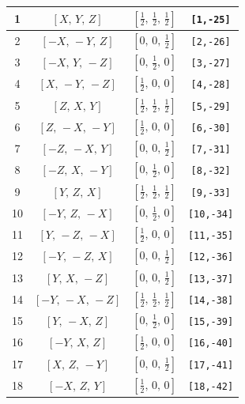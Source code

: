 \documentclass[fleqn,8pt]{jsarticle}
\begin{document}
\begin{longtable}{cccc}
1 & $\left[ X,\, Y,\, Z \right]$ & $\left[ \frac{1}{2},\, \frac{1}{2},\, \frac{1}{2} \right]$ & {\tt [1,-25]} \\ \hline
2 & $\left[ - X,\, - Y,\, Z \right]$ & $\left[ 0,\, 0,\, \frac{1}{2} \right]$ & {\tt [2,-26]} \\ \hline
3 & $\left[ - X,\, Y,\, - Z \right]$ & $\left[ 0,\, \frac{1}{2},\, 0 \right]$ & {\tt [3,-27]} \\ \hline
4 & $\left[ X,\, - Y,\, - Z \right]$ & $\left[ \frac{1}{2},\, 0,\, 0 \right]$ & {\tt [4,-28]} \\ \hline
5 & $\left[ Z,\, X,\, Y \right]$ & $\left[ \frac{1}{2},\, \frac{1}{2},\, \frac{1}{2} \right]$ & {\tt [5,-29]} \\ \hline
6 & $\left[ Z,\, - X,\, - Y \right]$ & $\left[ \frac{1}{2},\, 0,\, 0 \right]$ & {\tt [6,-30]} \\ \hline
7 & $\left[ - Z,\, - X,\, Y \right]$ & $\left[ 0,\, 0,\, \frac{1}{2} \right]$ & {\tt [7,-31]} \\ \hline
8 & $\left[ - Z,\, X,\, - Y \right]$ & $\left[ 0,\, \frac{1}{2},\, 0 \right]$ & {\tt [8,-32]} \\ \hline
9 & $\left[ Y,\, Z,\, X \right]$ & $\left[ \frac{1}{2},\, \frac{1}{2},\, \frac{1}{2} \right]$ & {\tt [9,-33]} \\ \hline
10 & $\left[ - Y,\, Z,\, - X \right]$ & $\left[ 0,\, \frac{1}{2},\, 0 \right]$ & {\tt [10,-34]} \\ \hline
11 & $\left[ Y,\, - Z,\, - X \right]$ & $\left[ \frac{1}{2},\, 0,\, 0 \right]$ & {\tt [11,-35]} \\ \hline
12 & $\left[ - Y,\, - Z,\, X \right]$ & $\left[ 0,\, 0,\, \frac{1}{2} \right]$ & {\tt [12,-36]} \\ \hline
13 & $\left[ Y,\, X,\, - Z \right]$ & $\left[ 0,\, 0,\, \frac{1}{2} \right]$ & {\tt [13,-37]} \\ \hline
14 & $\left[ - Y,\, - X,\, - Z \right]$ & $\left[ \frac{1}{2},\, \frac{1}{2},\, \frac{1}{2} \right]$ & {\tt [14,-38]} \\ \hline
15 & $\left[ Y,\, - X,\, Z \right]$ & $\left[ 0,\, \frac{1}{2},\, 0 \right]$ & {\tt [15,-39]} \\ \hline
16 & $\left[ - Y,\, X,\, Z \right]$ & $\left[ \frac{1}{2},\, 0,\, 0 \right]$ & {\tt [16,-40]} \\ \hline
17 & $\left[ X,\, Z,\, - Y \right]$ & $\left[ 0,\, 0,\, \frac{1}{2} \right]$ & {\tt [17,-41]} \\ \hline
18 & $\left[ - X,\, Z,\, Y \right]$ & $\left[ \frac{1}{2},\, 0,\, 0 \right]$ & {\tt [18,-42]} \\ \hline

\end{longtable}
\end{document}
